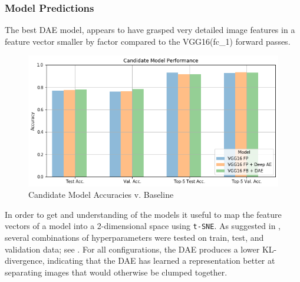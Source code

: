 \subsubsection{Model Predictions}
The best DAE model, appears to have grasped very detailed image features in a feature vector smaller by factor  compared to the VGG16(fc\_1) forward passes.

\begin{figure}[H]
  \centering
    \includegraphics[width=\textwidth]{pictures/plots/candidate_acc}
    \caption{Candidate Model Accuracies v. Baseline}
    \label{fig:candidates}
\end{figure}


In order to get and understanding of the models it useful to map the feature vectors of a model into a 2-dimensional space using \texttt{t-SNE}\autocite{Chu2017}\autocite{HintonScience2006}. 
As suggested in \autocite{wattenberg2016how}, several combinations of hyperparameters were tested on train, test, and validation data; see .
For all configurations, the DAE produces a lower KL-divergence, indicating that the DAE has learned a representation better at separating images that would otherwise be clumped together.


